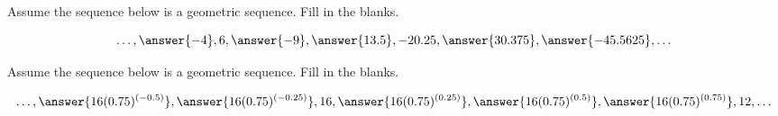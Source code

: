 \documentclass[nooutcomes]{ximera}
\begin{document}
\begin{problem}
Assume the sequence below is a geometric sequence.  Fill in the blanks.

\[
\dots, \answer{-4}, 6, \answer{-9}, \answer{13.5}, -20.25, \answer{30.375}, \answer{-45.5625}, \dots
\]

\end{problem}




\begin{problem}
Assume the sequence below is a geometric sequence.  Fill in the blanks.

\[
\dots, \answer{16(0.75)^{(-0.5)}}, \answer{16(0.75)^{(-0.25)}}, 16, \answer{16(0.75)^{(0.25)}}, \answer{16(0.75)^{(0.5)}}, \answer{16(0.75)^{(0.75)}}, 12, \dots
\]

\end{problem}
\end{document}
